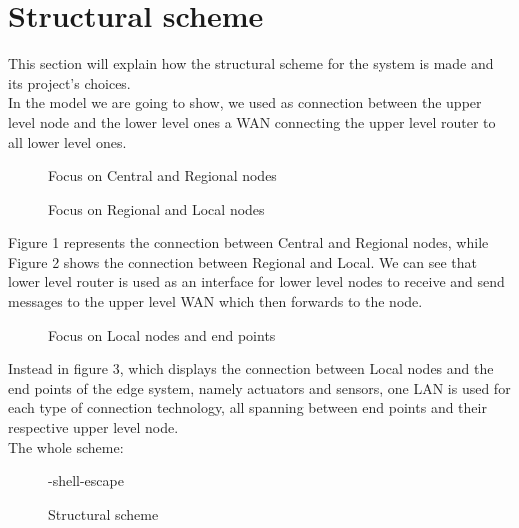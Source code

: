 \documentclass[11pt]{article}
\begin{document}
\section{Structural scheme}
This section will explain how the structural scheme for the system is made and its project's choices.\\
In the model we are going to show, we used as connection between the upper level node and the lower level ones a WAN connecting the upper level router to all lower level ones.\\
\begin{figure}[H]
	\hspace*{-3.75cm}
	\centering
  \frame{}
  \caption{Focus on Central and Regional nodes}
\end{figure}
\begin{figure}[H]
	\hspace*{-3.75cm}
	\frame{}
	\caption{Focus on Regional and Local nodes}
\end{figure}
Figure 1 represents the connection between Central and Regional nodes, while Figure 2 shows the connection between Regional and Local. We can  see that lower level router is used as an interface for lower level nodes to receive and send messages to the upper level WAN which then forwards to the node. \\
\begin{figure}[H]
	\hspace*{-3.75cm}
  \frame{}
  \caption{Focus on Local nodes and end points}
\end{figure}
Instead in figure 3, which displays the connection between Local nodes and the end points of the edge system, namely actuators and sensors, one LAN is used for each type of connection technology, all spanning between end points and their respective upper level node.\\
The whole scheme:
\begin{figure}[H]
	\hspace*{-3.75cm}
	\frame{}-shell-escape
  \caption{Structural scheme}
\end{figure}
\end{document}
